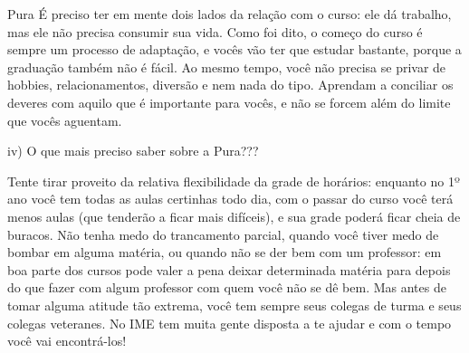 \begin{subsecao}{Pura}
É preciso ter em mente dois lados da relação com o curso: ele dá trabalho, mas ele não
precisa consumir sua vida. Como foi dito, o começo do curso é sempre um processo de adaptação,
e vocês vão ter que estudar bastante, porque a graduação também não é fácil. Ao mesmo tempo, 
você não precisa se privar de hobbies, relacionamentos, diversão e nem nada do tipo. Aprendam 
a conciliar os deveres com aquilo que é importante para vocês, e não se forcem além do limite
que vocês aguentam.

iv) O que mais preciso saber sobre a Pura???

Tente tirar proveito da relativa flexibilidade da grade de horários: enquanto
no 1º ano você tem todas as aulas certinhas todo dia, com o passar do
curso você terá menos aulas (que tenderão a ficar mais difíceis), e sua
grade poderá ficar cheia de buracos. Não tenha medo do trancamento parcial,
quando você tiver medo de bombar em alguma matéria, ou quando não se der bem com
um professor: em boa parte dos cursos pode valer a pena deixar determinada
matéria para depois do que fazer com algum professor com quem você não se dê
bem. Mas antes de tomar alguma atitude tão extrema, você tem sempre seus colegas
de turma e seus colegas veteranes. No IME tem muita gente disposta a te ajudar e
com o tempo você vai encontrá-los!


\end{subsecao}
